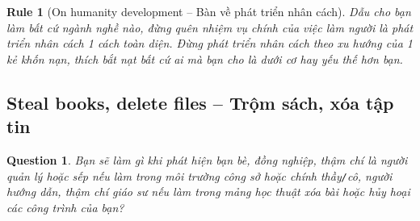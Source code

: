 \documentclass[12pt,oneside]{book}
\newtheorem{question}{Question}
\newtheorem{Rule}{Rule}
\begin{document}
\begin{Rule}[On humanity development -- Bàn về phát triển nhân cách]
	Dẫu cho bạn làm bất cứ ngành nghề nào, đừng quên nhiệm vụ chính của việc làm người là phát triển nhân cách 1 cách toàn diện. Đừng phát triển nhân cách theo xu hướng của 1 kẻ khốn nạn, thích bắt nạt bất cứ ai mà bạn cho là dưới cơ hay yếu thế hơn bạn.
\end{Rule}

\subsection{Steal books, delete files -- Trộm sách, xóa tập tin}

\begin{question}
	Bạn sẽ làm gì khi phát hiện bạn bè, đồng nghiệp, thậm chí là người quản lý hoặc sếp nếu làm trong môi trường công sở hoặc chính thầy{\tt/}cô, người hướng dẫn, thậm chí giáo sư nếu làm trong mảng học thuật xóa bài hoặc hủy hoại các công trình của bạn?
\end{question}
\end{document}
